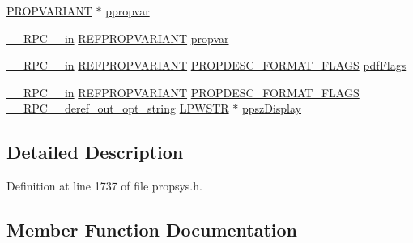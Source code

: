 \begin{DoxyCompactItemize}
\item 
\hyperlink{propidl_8h_ae902c1757cd16052896846fa4ebb88d8}{P\+R\+O\+P\+V\+A\+R\+I\+A\+NT} $\ast$ \hyperlink{struct_i_property_description_vtbl_a4e4eaf6023039b546b8a2099e0d5449d}{ppropvar}
\item 
\hyperlink{rpcsal_8h_a20b7f6da600a05c8b541659f14f7f0e6}{\+\_\+\+\_\+\+R\+P\+C\+\_\+\+\_\+in} \hyperlink{propidl_8h_ac8a8bd0f5f7f9b7e9f8e6fd4fd039fda}{R\+E\+F\+P\+R\+O\+P\+V\+A\+R\+I\+A\+NT} \hyperlink{struct_i_property_description_vtbl_a7f6802b2f978a31992685c2d6b41f06c}{propvar}
\item 
\hyperlink{rpcsal_8h_a20b7f6da600a05c8b541659f14f7f0e6}{\+\_\+\+\_\+\+R\+P\+C\+\_\+\+\_\+in} \hyperlink{propidl_8h_ac8a8bd0f5f7f9b7e9f8e6fd4fd039fda}{R\+E\+F\+P\+R\+O\+P\+V\+A\+R\+I\+A\+NT} \hyperlink{propsys_8h_a2aebc32bcab5d49a6377d14902ec66e2}{P\+R\+O\+P\+D\+E\+S\+C\+\_\+\+F\+O\+R\+M\+A\+T\+\_\+\+F\+L\+A\+GS} \hyperlink{struct_i_property_description_vtbl_aea3d749bc265ec894bd7d89e7a8f3cd1}{pdf\+Flags}
\item 
\hyperlink{rpcsal_8h_a20b7f6da600a05c8b541659f14f7f0e6}{\+\_\+\+\_\+\+R\+P\+C\+\_\+\+\_\+in} \hyperlink{propidl_8h_ac8a8bd0f5f7f9b7e9f8e6fd4fd039fda}{R\+E\+F\+P\+R\+O\+P\+V\+A\+R\+I\+A\+NT} \hyperlink{propsys_8h_a2aebc32bcab5d49a6377d14902ec66e2}{P\+R\+O\+P\+D\+E\+S\+C\+\_\+\+F\+O\+R\+M\+A\+T\+\_\+\+F\+L\+A\+GS} \hyperlink{rpcsal_8h_a8117c8d086bbc250c5117e81dc347263}{\+\_\+\+\_\+\+R\+P\+C\+\_\+\+\_\+deref\+\_\+out\+\_\+opt\+\_\+string} \hyperlink{mapinls_8h_acc28f72b93422cfd63a60e5a102a77b1}{L\+P\+W\+S\+TR} $\ast$ \hyperlink{struct_i_property_description_vtbl_abc7d91025bb59958ac0ffa00b0442f7d}{ppsz\+Display}
\end{DoxyCompactItemize}


\subsection{Detailed Description}


Definition at line 1737 of file propsys.\+h.



\subsection{Member Function Documentation}
